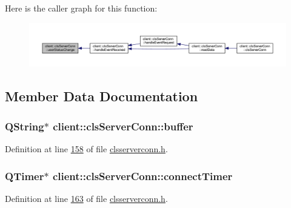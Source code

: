 Here is the caller graph for this function\-:
\nopagebreak
\begin{figure}[H]
\begin{center}
\leavevmode
\includegraphics[width=350pt]{d3/d65/classclient_1_1cls_server_conn_aa7679dfddcf23ffa4ce4febbc005995a_icgraph}
\end{center}
\end{figure}




\subsection{Member Data Documentation}
\hypertarget{classclient_1_1cls_server_conn_ac1da1dd86f59f8249d32506e220ec523}{
\subsubsection[{buffer}]{\setlength{\rightskip}{0pt plus 5cm}Q\-String$\ast$ client\-::cls\-Server\-Conn\-::buffer\hspace{0.3cm}{\ttfamily [private]}}}\label{d3/d65/classclient_1_1cls_server_conn_ac1da1dd86f59f8249d32506e220ec523}


Definition at line \hyperlink{clsserverconn_8h_source_l00158}{158} of file \hyperlink{clsserverconn_8h_source}{clsserverconn.\-h}.

\hypertarget{classclient_1_1cls_server_conn_ae7fe91be71bfb453f3f9b9013935d222}{
\subsubsection[{connect\-Timer}]{\setlength{\rightskip}{0pt plus 5cm}Q\-Timer$\ast$ client\-::cls\-Server\-Conn\-::connect\-Timer\hspace{0.3cm}{\ttfamily [private]}}}\label{d3/d65/classclient_1_1cls_server_conn_ae7fe91be71bfb453f3f9b9013935d222}


Definition at line \hyperlink{clsserverconn_8h_source_l00163}{163} of file \hyperlink{clsserverconn_8h_source}{clsserverconn.\-h}.

